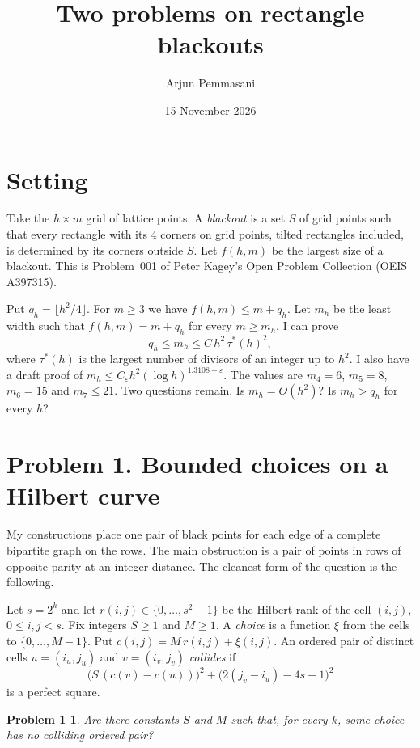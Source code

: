 \documentclass[10pt]{article}
\title{Two problems on rectangle blackouts}
\author{Arjun Pemmasani}
\date{15 November 2026}
\newtheorem*{problem1}{Problem 1}
\begin{document}
\maketitle

\section*{Setting}

Take the $h\times m$ grid of lattice points. A \emph{blackout} is a set $S$ of grid points such
that every rectangle with its 4 corners on grid points, tilted rectangles included, is determined
by its corners outside $S$. Let $f(h,m)$ be the largest size of a blackout. This is Problem~001
of Peter Kagey's Open Problem Collection (OEIS A397315).

Put $q_h=\lfloor h^2/4\rfloor$. For $m\ge3$ we have $f(h,m)\le m+q_h$. Let $m_h$ be the least
width such that $f(h,m)=m+q_h$ for every $m\ge m_h$. I can prove
\[
 q_h\le m_h\le C\,h^2\,\tau^*(h)^2,
\]
where $\tau^*(h)$ is the largest number of divisors of an integer up to $h^2$. I also have a draft
proof of $m_h\le C_\varepsilon h^2(\log h)^{1.3108+\varepsilon}$. The values are $m_4=6$, $m_5=8$,
$m_6=15$ and $m_7\le21$. Two questions remain. Is $m_h=O(h^2)$? Is $m_h>q_h$ for every $h$?

\section*{Problem 1. Bounded choices on a Hilbert curve}

My constructions place one pair of black points for each edge of a complete bipartite graph on
the rows. The main obstruction is a pair of points in rows of opposite parity at an integer
distance. The cleanest form of the question is the following.

Let $s=2^k$ and let $r(i,j)\in\{0,\dots,s^2-1\}$ be the Hilbert rank of the cell $(i,j)$,
$0\le i,j<s$. Fix integers $S\ge1$ and $M\ge1$. A \emph{choice} is a function
$\xi$ from the cells to $\{0,\dots,M-1\}$. Put $c(i,j)=M\,r(i,j)+\xi(i,j)$. An ordered pair of distinct cells
$u=(i_u,j_u)$ and $v=(i_v,j_v)$ \emph{collides} if
\[
 \bigl(S\,(c(v)-c(u))\bigr)^2+\bigl(2(j_v-i_u)-4s+1\bigr)^2
\]
is a perfect square.

\begin{problem1}
Are there constants $S$ and $M$ such that, for every $k$, some choice has no colliding ordered pair?
\end{problem1}
\end{document}
